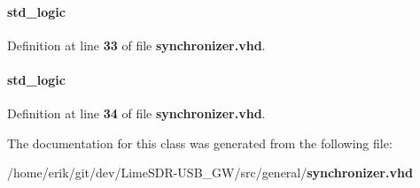 \paragraph[{signal\+\_\+d1}]{ {\bfseries \textcolor{comment}{std\+\_\+logic}\textcolor{vhdlchar}{ }} \hspace{0.3cm}{\ttfamily [Signal]}}\label{classsynchronizer_1_1arch_a30409dca7b8abd8f2aaf79ee8a5e2e23}


Definition at line {\bf 33} of file {\bf synchronizer.\+vhd}.

\paragraph[{signal\+\_\+d2}]{ {\bfseries \textcolor{comment}{std\+\_\+logic}\textcolor{vhdlchar}{ }} \hspace{0.3cm}{\ttfamily [Signal]}}\label{classsynchronizer_1_1arch_afde6f391c3116c7ac5b7d22554b4f402}


Definition at line {\bf 34} of file {\bf synchronizer.\+vhd}.



The documentation for this class was generated from the following file\+:\begin{DoxyCompactItemize}
\item 
/home/erik/git/dev/\+Lime\+S\+D\+R-\/\+U\+S\+B\+\_\+\+G\+W/src/general/{\bf synchronizer.\+vhd}\end{DoxyCompactItemize}
